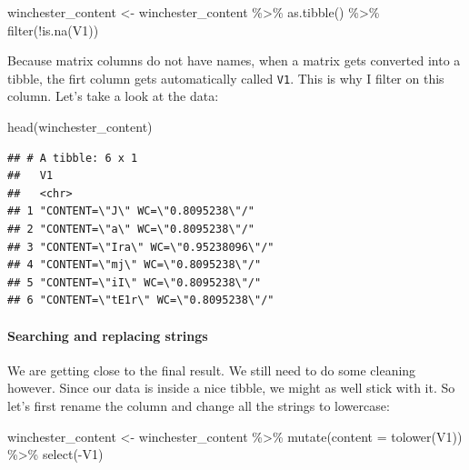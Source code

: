 \documentclass[
]{article}
\newenvironment{Shaded}{\begin{snugshade}}{\end{snugshade}}
\newcommand{\AttributeTok}[1]{\textcolor[rgb]{0.77,0.63,0.00}{#1}}
\newcommand{\FunctionTok}[1]{\textcolor[rgb]{0.00,0.00,0.00}{#1}}
\newcommand{\NormalTok}[1]{#1}
\newcommand{\OtherTok}[1]{\textcolor[rgb]{0.56,0.35,0.01}{#1}}
\newcommand{\SpecialCharTok}[1]{\textcolor[rgb]{0.00,0.00,0.00}{#1}}
\begin{document}
\begin{Shaded}
\begin{Highlighting}[]
\NormalTok{winchester\_content }\OtherTok{\textless{}{-}}\NormalTok{ winchester\_content }\SpecialCharTok{\%\textgreater{}\%}
  \FunctionTok{as.tibble}\NormalTok{() }\SpecialCharTok{\%\textgreater{}\%}
  \FunctionTok{filter}\NormalTok{(}\SpecialCharTok{!}\FunctionTok{is.na}\NormalTok{(V1))}
\end{Highlighting}
\end{Shaded}

Because matrix columns do not have names, when a matrix gets converted into a tibble, the firt column
gets automatically called \texttt{V1}. This is why I filter on this column. Let's take a look at the data:

\begin{Shaded}
\begin{Highlighting}[]
\FunctionTok{head}\NormalTok{(winchester\_content)}
\end{Highlighting}
\end{Shaded}

\begin{verbatim}
## # A tibble: 6 x 1
##   V1                                  
##   <chr>                               
## 1 "CONTENT=\"J\" WC=\"0.8095238\"/"   
## 2 "CONTENT=\"a\" WC=\"0.8095238\"/"   
## 3 "CONTENT=\"Ira\" WC=\"0.95238096\"/"
## 4 "CONTENT=\"mj\" WC=\"0.8095238\"/"  
## 5 "CONTENT=\"iI\" WC=\"0.8095238\"/"  
## 6 "CONTENT=\"tE1r\" WC=\"0.8095238\"/"
\end{verbatim}

\hypertarget{searching-and-replacing-strings}{%
\paragraph{Searching and replacing strings}\label{searching-and-replacing-strings}}

We are getting close to the final result. We still need to do some cleaning however. Since our data
is inside a nice tibble, we might as well stick with it. So let's first rename the column and
change all the strings to lowercase:

\begin{Shaded}
\begin{Highlighting}[]
\NormalTok{winchester\_content }\OtherTok{\textless{}{-}}\NormalTok{ winchester\_content }\SpecialCharTok{\%\textgreater{}\%} 
  \FunctionTok{mutate}\NormalTok{(}\AttributeTok{content =} \FunctionTok{tolower}\NormalTok{(V1)) }\SpecialCharTok{\%\textgreater{}\%} 
  \FunctionTok{select}\NormalTok{(}\SpecialCharTok{{-}}\NormalTok{V1)}
\end{Highlighting}
\end{Shaded}
\end{document}

